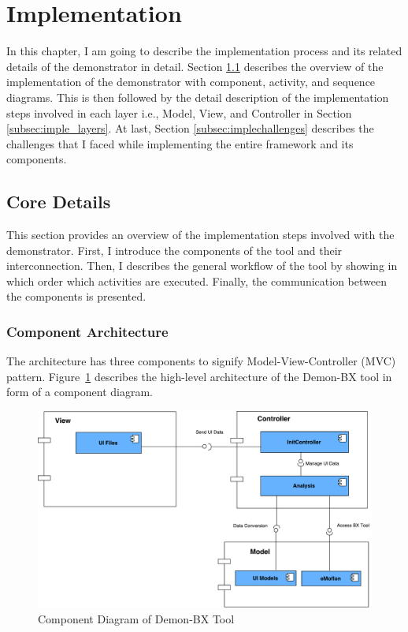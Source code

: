 \section{Implementation}\label{sec:implementation}
In this chapter, I am going to describe the implementation process and its related details of the demonstrator in detail. Section \ref{subsec:coredetails} describes the overview of the implementation of the demonstrator with component, activity, and sequence diagrams. This is then followed by the detail description of the implementation steps involved in each layer i.e., Model, View, and Controller in Section \ref{subsec:imple_layers}. At last, Section \ref{subsec:implechallenges} describes the challenges that I faced while implementing the entire framework and its components.

\subsection{Core Details}\label{subsec:coredetails}
This section provides an overview of the implementation steps involved with the demonstrator. First, I introduce the components of the tool and their interconnection. Then, I describes the general workflow of the tool by showing in which order which activities are executed. Finally, the communication between the components is presented.

\subsubsection{Component Architecture}\label{subsubsec:component}
The architecture has three components to signify Model-View-Controller (MVC) pattern. Figure~\ref{fig:Component_Diagram} describes the high-level architecture of the Demon-BX tool in form of a component diagram.

\begin{figure}
	\includegraphics[width=1\textwidth]{figures/Component_Diagram}
	\caption{Component Diagram of Demon-BX Tool}
	\label{fig:Component_Diagram}
\end{figure}

